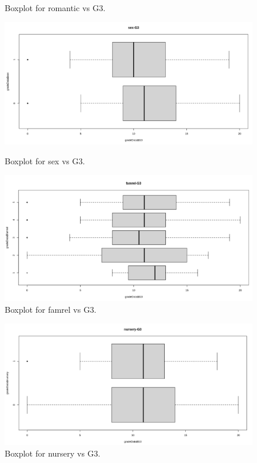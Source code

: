 \documentclass[a4paper]{article}
\begin{document}
\begin{enumerate}
\begin{figure}[H]
\begin{minipage}{0.5\textwidth}
            \caption{Boxplot for romantic vs G3.}
        \label{fig:boxplot17}
        \end{minipage}
    \end{figure}
    \begin{figure}[H]
        \centering
        \begin{minipage}{0.5\textwidth}
            \centering
            \includegraphics[width = 1\linewidth]{Images/38.PNG}
            \caption{Boxplot for sex vs G3.}
            \label{fig:boxplot18}
        \end{minipage}%
        \begin{minipage}{0.5\textwidth}
            \centering
            \includegraphics[width = 1\linewidth]{Images/39.PNG}
            \caption{Boxplot for famrel vs G3.}
            \label{fig:boxplot19}
        \end{minipage}
    \end{figure}
    \begin{figure}[H]
        \centering
        \includegraphics[width = 0.5\linewidth]{Images/40.PNG}
        \caption{Boxplot for nursery vs G3.}
        \label{fig:boxplot20}
    \end{figure}
\end{enumerate}
\end{document}
